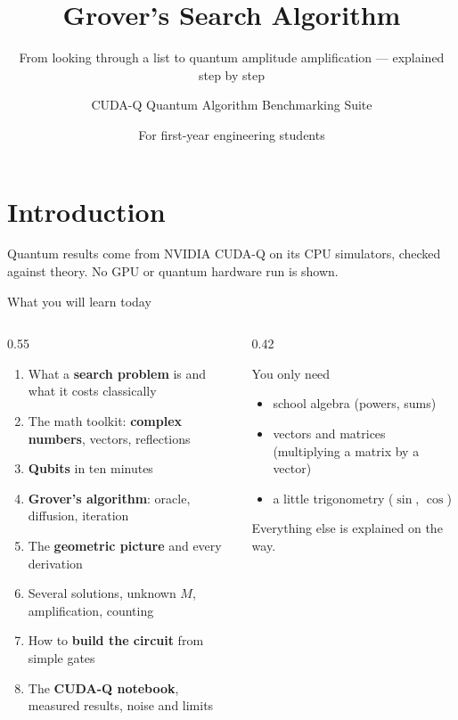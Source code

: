 \documentclass[aspectratio=169,11pt]{beamer}
\title{Grover's Search Algorithm}
\subtitle{From looking through a list to quantum amplitude amplification --- explained step by step}
\author{CUDA-Q Quantum Algorithm Benchmarking Suite}
\date{For first-year engineering students}
\newcommand{\key}[1]{{\color{qdark}\textbf{#1}}}
\begin{document}
\section{Introduction}
\begin{frame}
  \titlepage
  \centering\small\color{qgrey}
  Quantum results come from NVIDIA CUDA-Q on its CPU simulators, checked against theory. No GPU or quantum hardware run is shown.
\end{frame}

\begin{frame}{What you will learn today}
  \begin{columns}[T]
    \begin{column}{0.55\textwidth}
      \small
      \begin{enumerate}
        \item What a \key{search problem} is and what it costs classically
        \item The math toolkit: \key{complex numbers}, vectors, reflections
        \item \key{Qubits} in ten minutes
        \item \key{Grover's algorithm}: oracle, diffusion, iteration
        \item The \key{geometric picture} and every derivation
        \item Several solutions, unknown $M$, amplification, counting
        \item How to \key{build the circuit} from simple gates
        \item The \key{CUDA-Q notebook}, measured results, noise and limits
      \end{enumerate}
    \end{column}
    \begin{column}{0.42\textwidth}
      \begin{block}{You only need}
        \begin{itemize}
          \item school algebra (powers, sums)
          \item vectors and matrices (multiplying a matrix by a vector)
          \item a little trigonometry ($\sin$, $\cos$)
        \end{itemize}
        Everything else is explained on the way.
      \end{block}
    \end{column}
  \end{columns}
\end{frame}
\end{document}
